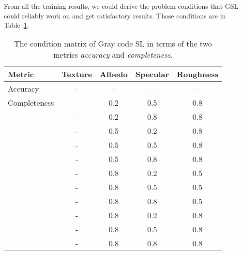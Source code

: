 From all the training results, we could derive the problem conditions that GSL could reliably work on and get satisfactory results. Those conditions are in Table~\ref{tab:sl_traing_result}.
\begin{table}[!htbp]
  \centering
  \begin{tabular}{l*{4}{c}}
  \hline
  \textbf{Metric} & Texture & Albedo & Specular & Roughness\\
  \hline
  Accuracy     & - & - & - & -\\
  \hline\hline
  Completeness & - & 0.2 & 0.5 & 0.8\\
               & - & 0.2 & 0.8 & 0.8\\
               & - & 0.5 & 0.2 & 0.8\\
               & - & 0.5 & 0.5 & 0.8\\
               & - & 0.5 & 0.8 & 0.8\\
               & - & 0.8 & 0.2 & 0.5\\
               & - & 0.8 & 0.5 & 0.5\\
               & - & 0.8 & 0.8 & 0.5\\
               & - & 0.8 & 0.2 & 0.8\\
               & - & 0.8 & 0.5 & 0.8\\
               & - & 0.8 & 0.8 & 0.8\\
  \hline
  \end{tabular}
  \caption{The condition matrix of Gray code SL in terms of the two metrics \textit{accuracy} and \textit{completeness}.}
  \label{tab:sl_traing_result}
\end{table}


